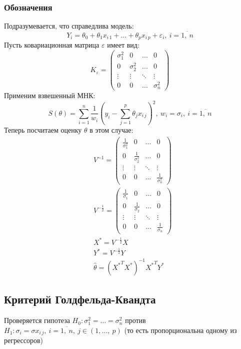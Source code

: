 \documentclass[12pt, a4paper]{article}
\begin{document}
\subsubsection*{Обозначения}
Подразумевается, что справедлива модель:
\[
Y_i = \theta_0 + \theta_1 x_{i\, 1} + \dots + \theta_p x_{i\, p} + \varepsilon_i,\ i = \overline{1,\ n}
\]
Пусть ковариационная матрица $\varepsilon$ имеет вид:
\[
K_{\varepsilon} = \begin{pmatrix}
    \sigma_1^2 & 0 & \dots & 0\\
    0 & \sigma_2^2 & \dots & 0\\
    \vdots & \vdots & \ddots & \vdots\\
    0 & 0 & \dots & \sigma_n^2
\end{pmatrix}
\]
Применим взвешенный МНК:
\[
S(\theta) = \sum_{i = 1}^{n} \frac{1}{w_i} {\left( y_i - \sum_{j = 1}^{p} \theta_j x_{i\, j} \right)}^2,\ w_i = \sigma_i,\ i = \overline{1,\ n}
\]
Теперь посчитаем оценку $\theta$ в этом случае:
\[
\begin{aligned}
    & V^{-1} = \begin{pmatrix}
        \frac{1}{\sigma^2_1} & 0 & \dots & 0\\
        0 & \frac{1}{\sigma^2_2} & \dots & 0\\
        \vdots & \vdots & \ddots & \vdots\\
        0 & 0 & \dots & \frac{1}{\sigma^2_n}
    \end{pmatrix}\\
    & V^{-\frac{1}{2}} = \begin{pmatrix}
        \frac{1}{\sigma_1} & 0 & \dots & 0\\
        0 & \frac{1}{\sigma_2} & \dots & 0\\
        \vdots & \vdots & \ddots & \vdots\\
        0 & 0 & \dots & \frac{1}{\sigma_n}
    \end{pmatrix}\\
    & X^* = V^{-\frac{1}{2}} X\\
    & Y^* = V^{-\frac{1}{2}} Y\\
    & \hat \theta = {\left( {X^*}^T X^* \right)}^{-1} {X^*}^T Y^*
\end{aligned}
\]
\subsection*{Критерий Голдфельда-Квандта}
Проверяется гипотеза $H_0: \sigma_1^2 = \dots = \sigma_n^2$ против $H_1: \sigma_i = \sigma x_{i\, j},\ i = \overline{1,\ n},\ j \in (1,\dots,\ p)$ (то есть пропорциональна одному из регрессоров)\\
\end{document}
